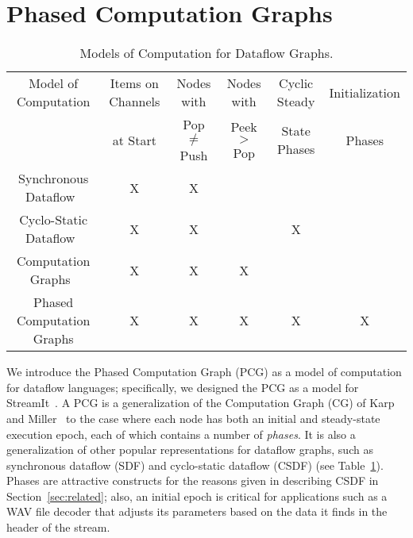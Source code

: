 \section{Phased Computation Graphs}
\label{sec:pcg}

\begin{table}[t]
\small
\begin{center}
\begin{tabular}{|c|c|c|c|c|c|} \hline
Model of Computation & Items on Channels & Nodes with & Nodes with & Cyclic Steady & Initialization \\
                     & at Start & Pop $\ne$ Push & Peek $>$ Pop & State Phases & Phases \\
\hline \hline
Synchronous Dataflow~\cite{LM87-i} & X & X & & & \\
\hline
Cyclo-Static Dataflow~\cite{BELP96} & X & X & & X & \\
\hline
Computation Graphs~\cite{KM66} & X & X & X & & \\
\hline
Phased Computation Graphs & X & X & X & X & X \\
\hline
\end{tabular}
\vspace{-6pt}
\caption{\protect\small Models of Computation for Dataflow Graphs.}
\label{tab:models}
\vspace{-12pt}
\end{center}
\end{table}

We introduce the Phased Computation Graph (PCG) as a model of
computation for dataflow languages; specifically, we designed the PCG
as a model for StreamIt~\cite{streamitcc}.  A PCG is a generalization
of the Computation Graph (CG) of Karp and Miller~\cite{KM66} to the
case where each node has both an initial and steady-state execution
epoch, each of which contains a number of {\it phases}.  It is also a
generalization of other popular representations for dataflow graphs,
such as synchronous dataflow (SDF) and cyclo-static dataflow (CSDF)
(see Table~\ref{tab:models}).  Phases are attractive constructs for
the reasons given in describing CSDF in Section~\ref{sec:related};
also, an initial epoch is critical for applications such as a WAV file
decoder that adjusts its parameters based on the data it finds in the
header of the stream.

